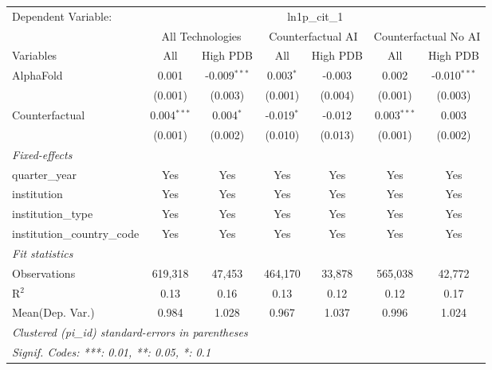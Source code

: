 \begingroup
\centering
\begin{tabular}{lcccccc}
   \tabularnewline \midrule \midrule
   Dependent Variable: & \multicolumn{6}{c}{ln1p\_cit\_1}\\
 & \multicolumn{2}{c}{All Technologies} & \multicolumn{2}{c}{Counterfactual AI} & \multicolumn{2}{c}{Counterfactual No AI} \\
\cmidrule(lr){1-1}\cmidrule(lr){2-3} \cmidrule(lr){4-5} \cmidrule(lr){6-7}
Variables & \multicolumn{1}{c}{All} & \multicolumn{1}{c}{High PDB} & \multicolumn{1}{c}{All} & \multicolumn{1}{c}{High PDB} & \multicolumn{1}{c}{All} & \multicolumn{1}{c}{High PDB} \\
\cmidrule(lr){1-1}\cmidrule(lr){2-2} \cmidrule(lr){3-3} \cmidrule(lr){4-4} \cmidrule(lr){5-5} \cmidrule(lr){6-6} \cmidrule(lr){7-7}
   AlphaFold                    & 0.001         & -0.009$^{***}$ & 0.003$^{*}$  & -0.003  & 0.002         & -0.010$^{***}$\\   
                                & (0.001)       & (0.003)        & (0.001)      & (0.004) & (0.001)       & (0.003)\\   
   Counterfactual               & 0.004$^{***}$ & 0.004$^{*}$    & -0.019$^{*}$ & -0.012  & 0.003$^{***}$ & 0.003\\   
                                & (0.001)       & (0.002)        & (0.010)      & (0.013) & (0.001)       & (0.002)\\   
   \midrule
   \emph{Fixed-effects}\\
   quarter\_year                & Yes           & Yes            & Yes          & Yes     & Yes           & Yes\\  
   institution                  & Yes           & Yes            & Yes          & Yes     & Yes           & Yes\\  
   institution\_type            & Yes           & Yes            & Yes          & Yes     & Yes           & Yes\\  
   institution\_country\_code   & Yes           & Yes            & Yes          & Yes     & Yes           & Yes\\  
   \midrule
   \emph{Fit statistics}\\
   Observations                 & 619,318       & 47,453         & 464,170      & 33,878  & 565,038       & 42,772\\  
   R$^2$                        & 0.13          & 0.16           & 0.13         & 0.12    & 0.12          & 0.17\\  
Mean(Dep. Var.) & 0.984 & 1.028 & 0.967 & 1.037 & 0.996 & 1.024 \\
   \midrule \midrule
   \multicolumn{7}{l}{\emph{Clustered (pi\_id) standard-errors in parentheses}}\\
   \multicolumn{7}{l}{\emph{Signif. Codes: ***: 0.01, **: 0.05, *: 0.1}}\\
\end{tabular}
\par\endgroup
